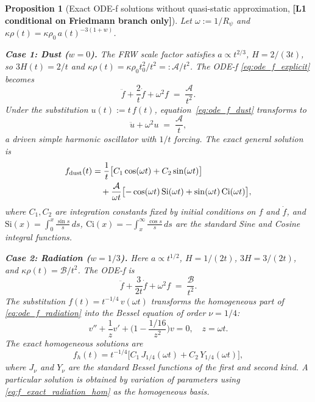 \documentclass[12pt,a4paper]{article}
\newtheorem{proposition}[theorem]{Proposition}
\theoremstyle{definition}
\theoremstyle{remark}
\begin{document}
\begin{proposition}[Exact ODE-f solutions without quasi-static approximation,
  \textbf{[L1 conditional on Friedmann branch only]}]
\label{prop:ode_f_full_dynamics}
Let $\omega := 1/R_\psi$ and $\kappa\rho(t) = \kappa\rho_0\,a(t)^{-3(1+w)}$.

\textbf{Case 1: Dust ($w=0$).}
The FRW scale factor satisfies $a \propto t^{2/3}$, $H = 2/(3t)$,
so $3H(t) = 2/t$ and $\kappa\rho(t) = \kappa\rho_0 t_0^2 / t^2 =: \mathcal{A}/t^2$.
The ODE-f \eqref{eq:ode_f_explicit} becomes
\begin{equation}
  \label{eq:ode_f_dust}
  \ddot{f} + \frac{2}{t}\dot{f} + \omega^2 f \;=\; \frac{\mathcal{A}}{t^2}.
\end{equation}
Under the substitution $u(t) := t\,f(t)$, equation~\eqref{eq:ode_f_dust}
transforms to
\begin{equation}
  \label{eq:ode_u_dust}
  \ddot{u} + \omega^2 u \;=\; \frac{\mathcal{A}}{t},
\end{equation}
a driven simple harmonic oscillator with $1/t$ forcing.
The exact general solution is
\begin{align}
  \label{eq:f_exact_dust}
  f_{\mathrm{dust}}(t)
  &= \frac{1}{t}\bigl[C_1\cos(\omega t) + C_2\sin(\omega t)\bigr] \notag\\
  &\quad + \frac{\mathcal{A}}{\omega t}
    \bigl[-\cos(\omega t)\,\mathrm{Si}(\omega t) + \sin(\omega t)\,\mathrm{Ci}(\omega t)\bigr],
\end{align}
where $C_1,C_2$ are integration constants fixed by initial conditions on $f$
and $\dot{f}$, and $\mathrm{Si}(x) = \int_0^x \tfrac{\sin s}{s}\,ds$,
$\mathrm{Ci}(x) = -\int_x^\infty \tfrac{\cos s}{s}\,ds$ are the standard
Sine and Cosine integral functions.

\textbf{Case 2: Radiation ($w=1/3$).}
Here $a \propto t^{1/2}$, $H = 1/(2t)$, $3H = 3/(2t)$,
and $\kappa\rho(t) = \mathcal{B}/t^2$.
The ODE-f is
\begin{equation}
  \label{eq:ode_f_radiation}
  \ddot{f} + \frac{3}{2t}\dot{f} + \omega^2 f \;=\; \frac{\mathcal{B}}{t^2}.
\end{equation}
The substitution $f(t) = t^{-1/4}\,v(\omega t)$ transforms the homogeneous
part of \eqref{eq:ode_f_radiation} into the Bessel equation of order $\nu=1/4$:
\begin{equation}
  \label{eq:bessel_radiation}
  v'' + \frac{1}{z}v' + \biggl(1 - \frac{1/16}{z^2}\biggr)v = 0,
  \quad z = \omega t.
\end{equation}
The exact homogeneous solutions are
\begin{equation}
  \label{eq:f_exact_radiation_hom}
  f_h(t) = t^{-1/4}\bigl[C_1\,J_{1/4}(\omega t) + C_2\,Y_{1/4}(\omega t)\bigr],
\end{equation}
where $J_\nu$ and $Y_\nu$ are the standard Bessel functions of the first
and second kind.
A particular solution is obtained by variation of parameters using
\eqref{eq:f_exact_radiation_hom} as the homogeneous basis.
\end{proposition}
\end{document}
